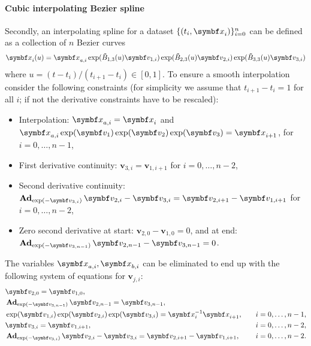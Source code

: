 \paragraph{Cubic interpolating Bezier spline} Secondly, an interpolating spline for a dataset $\{ ( t_{i}, \x_{i} ) \}_{i=0}^{n}$ can be defined as a collection of $n$ Bezier curves $$\x_{i}(u) = \x_{a, i} \exp (\tilde B_{1, 3}(u) \symbf v_{1, i})\exp (\tilde B_{2, 3}(u) \symbf v_{2, i})\exp (\tilde B_{3, 3}(u) \symbf v_{3, i})$$ where $u = (t - t_{i}) / (t_{i+1} - t_{i}) \in [0, 1]$. To ensure a smooth interpolation consider the following constraints (for simplicity we assume that $t_{i+1} - t_{i} = 1$ for all $i$; if not the derivative constraints have to be rescaled):
\begin{itemize}
  \item Interpolation: $\x_{a, i} = \x_{i}$ and $\x_{a, i} \exp(\symbf v_{1}) \exp(\symbf v_{2})\exp(\symbf v_{3})= \x_{i+1}$, for $i = 0, \ldots, n-1$,
  \item First derivative continuity: $\symbf v_{3, i} = \symbf v_{1, i+1}$ for $i = 0, \ldots, n-2$,
  \item Second derivative continuity: $\bAd_{\exp(-\symbf v_{3, i})} \symbf v_{2, i} - \symbf v_{3, i} = \symbf v_{2, i+1} - \symbf v_{1, i+1}$ for $i = 0, \ldots, n-2$,
  \item Zero second derivative at start: $\symbf v_{2, 0} - \symbf v_{1, 0} = 0$, and at end: $\bAd_{\exp(-\symbf v_{3, n-1})} \symbf v_{2, n-1} - \symbf v_{3, n-1} = 0$.
\end{itemize}
The variables $\x_{a, i}, \x_{b, i}$ can be eliminated to end up with the following system of equations for $\symbf v_{j, i}$:
\begin{equation}
  \label{eq:cubic_spline_equations}
  \begin{aligned}
     & \symbf v_{2, 0} = \symbf v_{1, 0},                                                                                                   \\
     & \bAd_{\exp(-\symbf v_{3, n-1})}\symbf v_{2, n-1} = \symbf v_{3, n-1},                                                                \\
     & \exp (\symbf v_{1, i}) \exp (\symbf v_{2, i}) \exp (\symbf v_{3, i}) = \x_{i}^{-1} \x_{i+1},                      & \quad i = 0, \ldots, n-1, \\
     & \symbf v_{3, i} = \symbf v_{1, i+1},                                                                     & \quad i = 0, \ldots, n-2, \\
     & \bAd_{\exp(-\symbf v_{3, i})} \symbf v_{2, i} - \symbf v_{3, i} = \symbf v_{2, i+1} - \symbf v_{1, i+1}, & \quad i = 0, \ldots, n-2. \\
  \end{aligned}
\end{equation}
